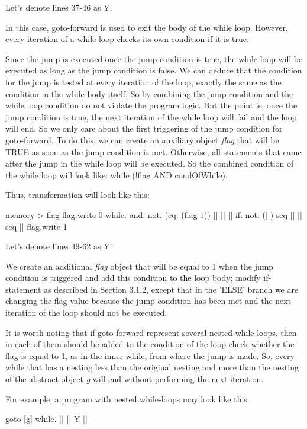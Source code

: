 \documentclass[sigplan,review,11pt,nonacm,natbib=false]{acmart}
\begin{document}
Let's denote lines 37-46 as Y.

In this case, goto-forward is used to exit the body of the while loop. However, every iteration of a while loop checks its own condition if it is true. 

Since the jump is executed once the jump condition is true, the while loop will be executed as long as the jump condition is false. We can deduce that the condition for the jump is tested at every iteration of the loop, exactly the same as the condition in the while body itself.
So by combining the jump condition and the while loop condition do not violate the program logic. But the point is, once the jump condition is true, the next iteration of the while loop will fail and the loop will end.
So we only care about the first triggering of the jump condition for goto-forward. To do this, we can create an auxiliary object \emph{flag} that will be TRUE as soon as the jump condition is met.
Otherwise, all statements that came after the jump in the while loop will be executed.
So the combined condition of the while loop will look like: while (!flag AND condOfWhile).

Thus, transformation will look like this:
\begin{ffcode}
memory > flag
flag.write 0
while.
  and.
    not. (eq. (flag 1))
    ||
  ||
    ||
    if.
      not. (||)
      seq
        ||
        ||
      seq
        ||
        flag.write 1
\end{ffcode}

Let's denote lines 49-62 as Y'.

We create an additional \emph{flag} object that will be equal to 1 when the jump condition is triggered and add this condition to the loop body; modify if-statement as described in Section 3.1.2, except that in the 'ELSE' branch we are changing the flag value because the jump condition has been met and the next iteration of the loop should not be executed.

It is worth noting that if goto forward represent several nested while-loops, then in each of them should be added to the condition of the loop check whether the flag is equal to 1, as in the inner while, from where the jump is made. So, every while that has a nesting less than the original nesting and more than the nesting of the abstract object \emph{g} will end without performing the next iteration.

For example, a program with nested while-loops may look like this:
\begin{ffcode}
goto
  [g]
    while.
      ||
      ||
        Y
        ||
\end{ffcode}
\end{document}
